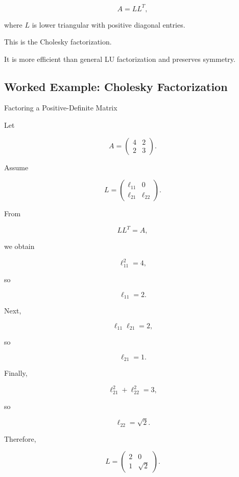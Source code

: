 \[
\boxed{
A
=
LL^T,
}
\]

where \(L\) is lower triangular with positive diagonal entries.

This is the Cholesky factorization.

It is more efficient than general LU factorization and preserves symmetry.

\subsection{Worked Example: Cholesky Factorization}
\label{subsec:worked-cholesky}

\begin{workedexamplebox}{Factoring a Positive-Definite Matrix}

Let

\[
A
=
\begin{pmatrix}
4&2\\
2&3
\end{pmatrix}.
\]

Assume

\[
L
=
\begin{pmatrix}
\ell_{11}&0\\
\ell_{21}&\ell_{22}
\end{pmatrix}.
\]

From

\[
LL^T=A,
\]

we obtain

\[
\ell_{11}^2=4,
\]

so

\[
\ell_{11}=2.
\]

Next,

\[
\ell_{11}\ell_{21}=2,
\]

so

\[
\ell_{21}=1.
\]

Finally,

\[
\ell_{21}^2+\ell_{22}^2=3,
\]

so

\[
\ell_{22}=\sqrt{2}.
\]

Therefore,

\begin{answerbox}
\[
\boxed{
L
=
\begin{pmatrix}
2&0\\
1&\sqrt{2}
\end{pmatrix}.
}
\]
\end{answerbox}

\end{workedexamplebox}

